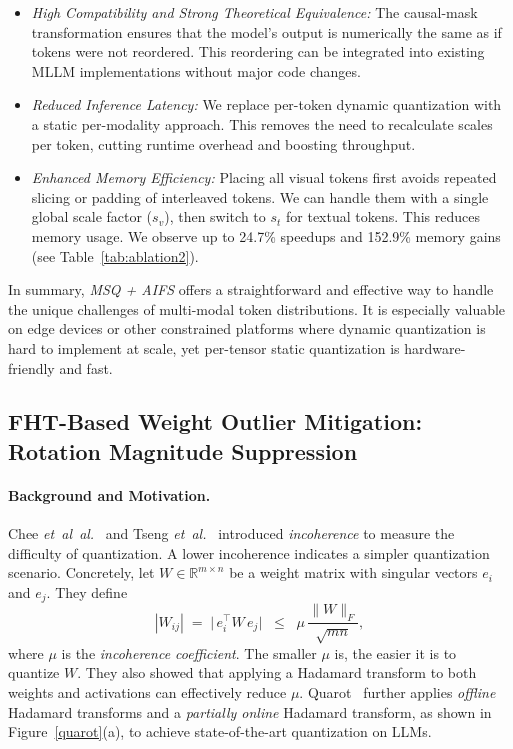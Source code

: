 \begin{itemize}[leftmargin=16pt]
\itemsep0pt
    \item \emph{High Compatibility and Strong Theoretical Equivalence:}  
    The causal-mask transformation ensures that the model’s output is numerically the same as if tokens were not reordered. This reordering can be integrated into existing MLLM implementations without major code changes.
    
    \item \emph{Reduced Inference Latency:}  
    We replace per-token dynamic quantization with a static per-modality approach. This removes the need to recalculate scales per token, cutting runtime overhead and boosting throughput.  

    \item \emph{Enhanced Memory Efficiency:}  
    Placing all visual tokens first avoids repeated slicing or padding of interleaved tokens. We can handle them with a single global scale factor ($s_{v}$), then switch to $s_{t}$ for textual tokens. This reduces memory usage. We observe up to 24.7\% speedups and 152.9\% memory gains (see Table~\ref{tab:ablation2}).  
\end{itemize}

In summary, \emph{MSQ + AIFS} offers a straightforward and effective way to handle the unique challenges of multi-modal token distributions. It is especially valuable on edge devices or other constrained platforms where dynamic quantization is hard to implement at scale, yet per-tensor static quantization is hardware-friendly and fast.


\vspace{-2mm}


\subsection{FHT-Based Weight Outlier Mitigation: Rotation Magnitude Suppression}
\label{sec:fht-outlier}

\paragraph{Background and Motivation.}
Chee \emph{et~al~al.}~\citep{chee2024quip} and Tseng \emph{et~al.}~\citep{tseng2024quip+} introduced \emph{incoherence} to measure the difficulty of quantization. A lower incoherence indicates a simpler quantization scenario. Concretely, let \(W \in \mathbb{R}^{m\times n}\) be a weight matrix with singular vectors \(e_i\) and \(e_j\). They define
\begin{equation}
\label{eq:incoherence}
|W_{ij}| \;=\; \bigl|\,e_i^\top W\,e_j\bigr|\;\;\le\;\;\mu\,\frac{\|W\|_F}{\sqrt{mn}},
\end{equation}
where \(\mu\) is the \emph{incoherence coefficient}. The smaller \(\mu\) is, the easier it is to quantize \(W\). They also showed that applying a Hadamard transform to both weights and activations can effectively reduce \(\mu\). Quarot~\citep{ashkboos2024quarot} further applies \emph{offline} Hadamard transforms and a \emph{partially online} Hadamard transform, as shown in Figure~\ref{quarot}(a), to achieve state-of-the-art quantization on LLMs.

